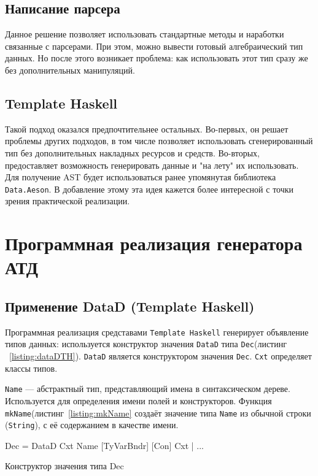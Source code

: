 \subsection{Написание парсера}
Данное решение позволяет использовать стандартные методы и наработки связанные с парсерами. При этом, можно вывести готовый алгебраический тип данных. Но после этого возникает проблема: как использовать этот тип сразу же без дополнительных манипуляций.   	

\subsection{Template Haskell}
Такой подход оказался предпочтительнее остальных. Во-первых, он решает проблемы других подходов, в том числе позволяет использовать сгенерированный тип без дополнительных накладных ресурсов и средств. Во-вторых, предоставляет возможность генерировать данные  и "на лету" их использовать. Для получение AST будет использоваться ранее упомянутая библиотека \lstinline{Data.Aeson}. В добавление этому эта идея кажется более интересной с точки зрения практической реализации. 

\section{Программная реализация генератора АТД}

\subsection{Применение DataD (Template Haskell)}

Программная реализация средставами \lstinline{Template Haskell} генерирует объявление типов данных: используется конструктор значения \lstinline{DataD} типа \lstinline{Dec}(листинг ~\ref{listing:dataDTH}). \lstinline{DataD} является конструктором значения \lstinline{Dec}. \lstinline{Cxt} определяет классы типов. 

\lstinline{Name} --- абстрактный тип, представляющий имена в синтаксическом дереве. Используется для определения имени полей и конструкторов. Функция \lstinline{mkName}(листинг~\ref{listing:mkName} создаёт значение типа \lstinline{Name} из обычной строки (\lstinline{String}), с её содержанием в качестве имени.

\begin{ListingEnv}[H]
\begin{Verb}
Dec 
   = DataD Cxt Name [TyVarBndr] [Con] Cxt
   | ...
\end{Verb}
\caption{Конструктор значения типа Dec}
\label{listing:dataDTH}
\end{ListingEnv} 

